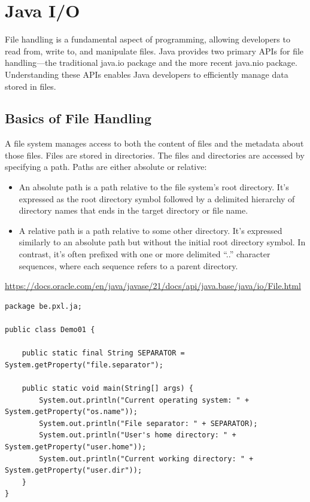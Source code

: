 \chapter{Java I/O}

 \begin{summary}
File handling is a fundamental aspect of programming, allowing developers to read from, write to, and manipulate files.  Java provides two primary APIs for file handling—the traditional java.io package and the more recent java.nio package. Understanding these APIs enables Java developers to efficiently manage data stored in files. 
 \end{summary}
 
 \section{Basics of File Handling}
 
A file system manages access to both the content of files and the metadata about those files.  Files are stored in directories.  The files and directories are accessed by specifying a path.  Paths are either absolute or relative:

\begin{itemize}
\item An absolute path is a path relative to the file system’s root directory. It’s expressed as the root directory symbol followed by a delimited hierarchy of directory names that ends in the target directory or file name.
\item A relative path is a path relative to some other directory. It’s expressed similarly to an absolute path but without the initial root directory symbol. In contrast, it’s often prefixed with one or more delimited “..” character sequences, where each sequence refers to a parent directory.
\end{itemize}

\begin{thm}
        \url{https://docs.oracle.com/en/java/javase/21/docs/api/java.base/java/io/File.html}
    \end{thm}



\begin{lstlisting}
package be.pxl.ja;

public class Demo01 {

	public static final String SEPARATOR = System.getProperty("file.separator");

	public static void main(String[] args) {
		System.out.println("Current operating system: " + System.getProperty("os.name"));
		System.out.println("File separator: " + SEPARATOR);
		System.out.println("User's home directory: " + System.getProperty("user.home"));
		System.out.println("Current working directory: " + System.getProperty("user.dir"));
	}
}
\end{lstlisting}


